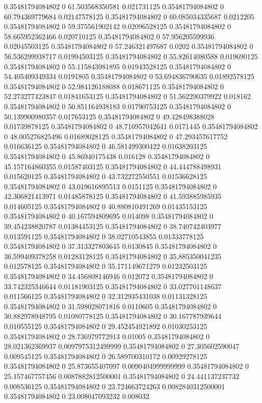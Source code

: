 0.35481794084802 0 61.503568350581 0.021731125
0.35481794084802 0 60.794369779684 0.02147578125
0.35481794084802 0 60.085034335687 0.0212205
0.35481794084802 0 59.375561902142 0.02096528125
0.35481794084802 0 58.665952362466 0.020710125
0.35481794084802 0 57.956205599936 0.02045503125
0.35481794084802 0 57.246321497687 0.0202
0.35481794084802 0 56.536299938717 0.01994503125
0.35481794084802 0 55.82614080588 0.019690125
0.35481794084802 0 55.115843981895 0.01943528125
0.35481794084802 0 54.405409349334 0.0191805
0.35481794084802 0 53.694836790635 0.01892578125
0.35481794084802 0 52.984126188088 0.018671125
0.35481794084802 0 52.273277423847 0.01841653125
0.35481794084802 0 51.562290379922 0.018162
0.35481794084802 0 50.851164938183 0.01790753125
0.35481794084802 0 50.139900980357 0.017653125
0.35481794084802 0 49.428498388028 0.01739878125
0.35481794084802 0 48.716957042641 0.0171445
0.35481794084802 0 48.005276825496 0.01689028125
0.35481794084802 0 47.293457617752 0.016636125
0.35481794084802 0 46.581499300422 0.01638203125
0.35481794084802 0 45.86940175438 0.016128
0.35481794084802 0 45.157164860355 0.01587403125
0.35481794084802 0 44.444788498931 0.015620125
0.35481794084802 0 43.732272550551 0.01536628125
0.35481794084802 0 43.019616895513 0.0151125
0.35481794084802 0 42.306821413971 0.01485878125
0.35481794084802 0 41.593885985935 0.014605125
0.35481794084802 0 40.880810491269 0.01435153125
0.35481794084802 0 40.167594809695 0.014098
0.35481794084802 0 39.454238820787 0.01384453125
0.35481794084802 0 38.740742403977 0.013591125
0.35481794084802 0 38.02710543855 0.01333778125
0.35481794084802 0 37.313327803645 0.0130845
0.35481794084802 0 36.599409378258 0.01283128125
0.35481794084802 0 35.885350041235 0.012578125
0.35481794084802 0 35.171149671279 0.01232503125
0.35481794084802 0 34.456808146946 0.012072
0.35481794084802 0 33.742325346644 0.01181903125
0.35481794084802 0 33.027701148637 0.011566125
0.35481794084802 0 32.312935431038 0.01131328125
0.35481794084802 0 31.598028071816 0.0110605
0.35481794084802 0 30.882978948795 0.01080778125
0.35481794084802 0 30.167787939644 0.010555125
0.35481794084802 0 29.452454921892 0.01030253125
0.35481794084802 0 28.736979772913 0.01005
0.35481794084802 0 28.021362369937 0.0097975312499999
0.35481794084802 0 27.305602590047 0.009545125
0.35481794084802 0 26.589700310172 0.00929278125
0.35481794084802 0 25.873655407097 0.0090404999999999
0.35481794084802 0 25.157467757456 0.0087882812500001
0.35481794084802 0 24.441137237732 0.008536125
0.35481794084802 0 23.724663724263 0.0082840312500001
0.35481794084802 0 23.008047093232 0.008032
